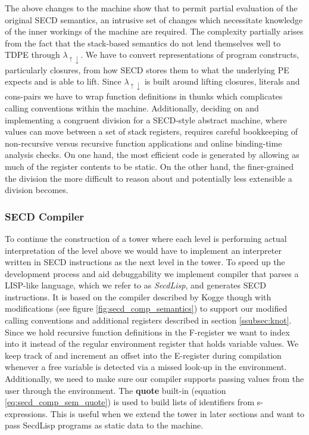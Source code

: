 \documentclass[a4paper,12pt,twoside,openright]{report}
\theoremstyle{definition}
\newcommand{\mslang}{$\lambda_{\uparrow\downarrow}$}
\newcommand{\secdlisp}{SecdLisp}
\begin{document}
The above changes to the machine show that to permit partial evaluation of the original SECD semantics, an intrusive set of changes which necessitate knowledge of the inner workings of the machine are required. The complexity partially arises from the fact that the stack-based semantics do not lend themselves well to TDPE through \mslang. We have to convert representations of program constructs, particularly closures, from how SECD stores them to what the underlying PE expects and is able to lift. Since \mslang{} is built around lifting closures, literals and cons-pairs we have to wrap function definitions in thunks which complicates calling conventions within the machine. Additionally, deciding on and implementing a congruent division for a SECD-style abstract machine, where values can move between a set of stack registers, requires careful bookkeeping of non-recursive versus recursive function applications and online binding-time analysis checks. On one hand, the most efficient code is generated by allowing as much of the register contents to be static. On the other hand, the finer-grained the division the more difficult to reason about and potentially less extensible a division becomes.

\subsubsection{SECD Compiler}\label{subsec:secd_comp}
To continue the construction of a tower where each level is performing actual interpretation of the level above we would have to implement an interpreter written in SECD instructions as the next level in the tower. To speed up the development process and aid debuggability we implement compiler that parses a LISP-like language, which we refer to as \textit{\secdlisp{}}, and generates SECD instructions. It is based on the compiler described by Kogge \cite{kogge1990architecture} though with modifications (see figure \ref{fig:secd_comp_semantics}) to support our modified calling conventions and additional registers described in section \ref{ssubsec:knot}. Since we hold recursive function definitions in the F-register we want to index into it instead of the regular environment register that holds variable values. We keep track of and increment an offset into the E-register during compilation whenever a free variable is detected via a missed look-up in the environment. Additionally, we need to make sure our compiler supports passing values from the user through the environment. The \textbf{quote} built-in (equation \ref{eq:secd_comp_sem_quote}) is used to build lists of identifiers from s-expressions. This is useful when we extend the tower in later sections and want to pass \secdlisp{} programs as static data to the machine.
\end{document}
